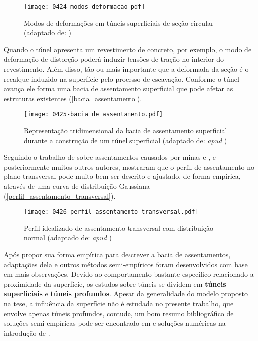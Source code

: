 \begin{figure}[H]
	\begin{center}
		\texttt{[image: 0424-modos\_deformacao.pdf]}
	\end{center}
	\caption{\label{modos_deformacao}Modos de deformações em túneis superficiais de seção circular (adaptado de: )}
\end{figure}

Quando o túnel apresenta um revestimento de concreto, por exemplo, o modo de deformação de distorção poderá induzir tensões de tração no interior do revestimento. Além disso, tão ou mais importante que a deformada da seção é o recalque induzido na superfície pelo processo de escavação. Conforme o túnel avança ele forma uma bacia de assentamento superficial que pode afetar as estruturas existentes (\autoref{bacia_assentamento}).

\begin{figure}[H]
	\begin{center}
		\texttt{[image: 0425-bacia de assentamento.pdf]}
	\end{center}
	\caption{\label{bacia_assentamento}Representação tridimensional da bacia de assentamento superficial durante a construção de um túnel superficial (adaptado de:  \textit{apud} )}
\end{figure}

Seguindo o trabalho de  sobre assentamentos causados por minas  e , e posteriormente muitos outros autores, mostraram que o perfil de assentamento no plano transversal pode muito bem ser descrito e ajustado, de forma empírica, através de uma curva de distribuição Gaussiana (\autoref{perfil_assentamento_transversal}).

\begin{figure}[H]
	\begin{center}
		\texttt{[image: 0426-perfil assentamento transversal.pdf]}
	\end{center}
	\caption{\label{perfil_assentamento_transversal}Perfil idealizado de assentamento transversal com distribuição normal (adaptado de:  \textit{apud} )}
\end{figure}

Após  propor sua forma empírica para descrever a bacia de assentamentos, adaptações dela e outros métodos semi-empíricos foram desenvolvidos com base em mais observações. Devido ao comportamento bastante específico relacionado a proximidade da superfície, os estudos sobre túneis se dividem em \textbf{túneis superficiais} e \textbf{túneis profundos}. Apesar da generalidade do modelo proposto na tese, a influência da superfície não é estudada no presente trabalho, que envolve apenas túneis profundos, contudo, um bom resumo bibliográfico de soluções semi-empíricas pode ser encontrado em  e soluções numéricas na introdução de .

